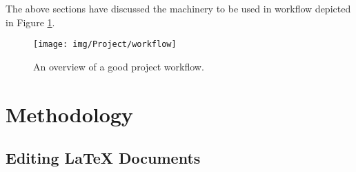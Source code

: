 \documentclass[../../main.tex]{subfiles}
\begin{document}
The above sections have discussed the machinery to be used in workflow depicted in Figure \ref{fig:workflow}.


\begin{figure}[H]
	\centering
	\texttt{[image: img/Project/workflow]}
	\setlength{\belowcaptionskip}{-8pt}
	\caption{An overview of a good project workflow.}
	\label{fig:workflow}
\end{figure}

\section{Methodology}
	\subsection{Editing \LaTeX{} Documents}
\end{document}
